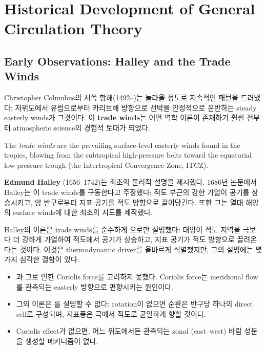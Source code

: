 
\section{Historical Development of General Circulation Theory}\label{sec:history}

\subsection{Early Observations: Halley and the Trade Winds}


Christopher Columbus의 서쪽 항해(1492--)는 놀라울 정도로 지속적인 패턴을 드러냈다:
저위도에서 유럽으로부터 카리브해 방향으로 선박을 안정적으로 운반하는 steady easterly winds가
그것이다.  이 \textbf{trade winds}는 어떤 역학 이론이 존재하기 훨씬 전부터
atmospheric science의 경험적 토대가 되었다.

The \emph{trade winds} are the prevailing surface-level easterly winds found in the
tropics, blowing from the subtropical high-pressure belts toward the equatorial
low-pressure trough (the Intertropical Convergence Zone, ITCZ).

\textbf{Edmund Halley} (1656--1742)는 최초의 물리적 설명을 제시했다.
1686년 논문에서 Halley는 이 trade winds를 구동한다고 주장했다:
적도 부근의 강한 가열이 공기를 상승시키고, 양 반구로부터 지표 공기를 적도 방향으로 끌어당긴다.
또한 그는 열대 해양의 surface winds에 대한 최초의 지도를 제작했다.

\begin{remark}
  Halley의 이론은 trade winds를 순수하게 으로만 설명했다:
  태양이 적도 지역을 극보다 더 강하게 가열하여 적도에서 공기가 상승하고, 지표 공기가 적도 방향으로
  끌려온다는 것이다.  이것은 thermodynamic driver를 올바르게 식별했지만,
  그의 설명에는 몇 가지 심각한 결함이 있다:
  \begin{itemize}
    \item {}과 그로 인한 Coriolis force를 고려하지 못했다.
      Coriolis force는 meridional flow를 관측되는 easterly 방향으로 편향시키는 원인이다.
    \item 그의 이론은 를 설명할 수 없다: rotation이 없으면
      순환은 반구당 하나의 direct cell로 구성되며, 지표풍은 극에서 적도로 균일하게 향할 것이다.
    \item Coriolis effect가 없으면, 어느 위도에서든 관측되는 zonal (east--west) 바람 성분을
      생성할 메커니즘이 없다.
  \end{itemize}
\end{remark}

